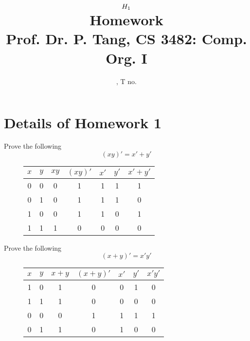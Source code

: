 \documentclass[11pt]{article}
\title{
	$H_{1}$ \\
	{\large Homework \rom{\hw}} \\
	{\normalsize Prof. Dr. P. Tang, CS 3482: Comp. Org. I}
}
\author{
	\name, T no. \tno
}
\begin{document}
\maketitle

\section{Details of Homework 1}

\begin{question}
	Prove the following
	\begin{equation}
		(xy)' = x'+y'
	\end{equation}

	\begin{figure}[h]
		\begin{center}
			\begin{tabular} { c c | c c c c c }
				$x$ & $y$ & $xy$ & $(xy)'$ & $x'$ & $y'$ & $x'+y'$ \\
				\hline
				0 & 0 & 0 & 1 & 1 & 1 & 1 \\
				0 & 1 & 0 & 1 & 1 & 1 & 0 \\
				1 & 0 & 0 & 1 & 1 & 0 & 1 \\
				1 & 1 & 1 & 0 & 0 & 0 & 0 \\
			\end{tabular}
		\end{center}
	\end{figure}
\end{question}

\begin{question}
	Prove the following
	\begin{equation}
		(x+y)' = x'y'
	\end{equation}

	\begin{figure}[h]
		\begin{center}
			\begin{tabular} { c c | c c c c c }
				$x$ & $y$ & $x+y$ & $(x+y)'$ & $x'$ & $y'$ & $x'y'$ \\
				\hline
				1 & 0 & 1 & 0 & 0 & 1 & 0 \\
				1 & 1 & 1 & 0 & 0 & 0 & 0 \\
				0 & 0 & 0 & 1 & 1 & 1 & 1 \\
				0 & 1 & 1 & 0 & 1 & 0 & 0 \\
			\end{tabular}
		\end{center}
	\end{figure}
\end{question}
\end{document}
